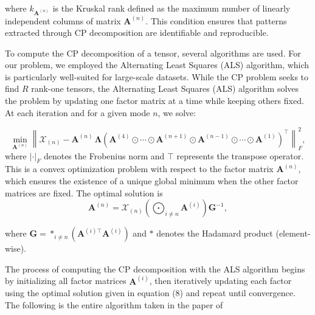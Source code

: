 \documentclass{ieeeaccess}
\begin{document}
\noindent where $k_{\mathbf{A}^{(n)}}$ is the Kruskal rank defined as the maximum number of linearly independent columns of matrix $\mathbf{A}^{(n)}$. This condition ensures that patterns extracted through CP decomposition are identifiable and reproducible.



To compute the CP decomposition of a tensor, several algorithms are used. For our problem, we employed the Alternating Least Squares (ALS) algorithm, which is particularly well-suited for large-scale datasets. While the CP problem seeks to find $R$ rank-one tensors, 
the Alternating Least Squares (ALS) algorithm solves the problem by updating one factor matrix at a time while keeping others fixed. At each iteration and for a given mode $n$, we solve:

\begin{equation}
\min_{\mathbf{A}^{(n)}} \left\| \mathcal{X}_{(n)} - \mathbf{A}^{(n)} \, \boldsymbol{\Lambda} 
\left( \mathbf{A}^{(4)} \odot \cdots \odot \mathbf{A}^{(n+1)} \odot \mathbf{A}^{(n-1)} \odot \cdots \odot \mathbf{A}^{(1)} \right)^\top 
\right\|_F^2,
\end{equation}
\noindent where $\left|\cdot\right|_{F}$ denotes the Frobenius norm and $\top$ represents the transpose operator. This is a convex optimization problem with respect to the factor matrix $\mathbf{A}^{(n)}$, which ensures the existence of a unique global minimum when the other factor matrices are fixed. The optimal solution is
\begin{equation}
\mathbf{A}^{(n)} = \mathcal{X}_{(n)} 
\left( \bigodot_{i \neq n} \mathbf{A}^{(i)} \right) 
\mathbf{G}^{-1},
\end{equation}

\noindent where 
$
\mathbf{G} = \ast_{i \neq n} \left( \mathbf{A}^{(i)\top} \mathbf{A}^{(i)} \right) 
$ and $\ast$ denotes the Hadamard product (element-wise). 

The process of computing the CP decomposition with the ALS algorithm begins by initializing all factor matrices $\mathbf{A}^{(i)}$, then iteratively updating each factor using the optimal solution given in equation (8) and repeat until convergence. The following is the entire algorithm taken in the paper of \cite{kruskal1977three}
\end{document}
